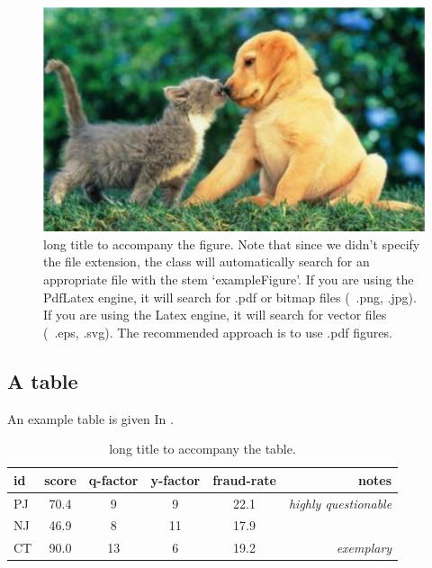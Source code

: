 \begin{figure}[H]
\includegraphics[scale=.3]{figs/exampleFigure}
\caption[short caption to appear in list of figures]
{
long title to accompany the figure. Note that since we didn't specify the file extension, the class will automatically search for an appropriate file with the stem `exampleFigure'. If you are using the PdfLatex engine, it will search for .pdf or bitmap files (\eg~.png, .jpg). If you are using the Latex engine, it will search for vector files (\eg~.eps, .svg). The recommended approach is to use .pdf figures.
}
\label{fig:exampleFigure}
\end{figure}


\subsection{A table}
An example table is given In .

\begin{table}[H]
\centering
\begin{tabular}{lccccr}
\toprule
id&score&q-factor&y-factor&fraud-rate&notes\\
\midrule
PJ	& 70.4 & 9	& 9 	& 22.1 & \textit{highly questionable}\\
NJ	& 46.9 & 8	& 11 & 17.9 &\\
CT& 90.0 & 13	& 6 	& 19.2 & \textit{exemplary}\\
\bottomrule
\end{tabular}
\caption[short caption to appear in list of tables]
{
long title to accompany the table.
}
\label{tab:exampleTable}
\end{table}

